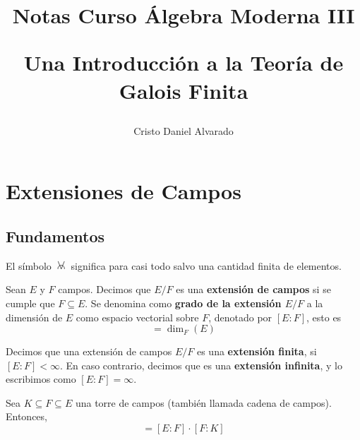 \documentclass[12pt]{report}
\theoremstyle{largebreak}
\newcommand{\afa}{\:
    \begin{tikzpicture}
        \draw [line width = 0.17 mm, black] (0,0) -- (-0.115,0.29);
        \draw [line width = 0.17 mm, black] (0,0) -- (0.115,0.29);
        \draw [line width = 0.17 mm, black] (-0.12,0) arc (190:-10:0.12cm);
    \end{tikzpicture}
    \:
}
\begin{document}
    \setlength{\parskip}{5pt} %
    \setlength{\parindent}{12pt} %
    \title{Notas Curso Álgebra Moderna III
    
    Una Introducción a la Teoría de Galois Finita}
    \author{Cristo Daniel Alvarado}
    \maketitle

    \tableofcontents %

    
    \chapter{Extensiones de Campos}
    
    \section{Fundamentos}

    \begin{obs}
        El símbolo $\afa$ significa para casi todo salvo una cantidad finita de elementos.
    \end{obs}

    \begin{mydef}
        Sean $E$ y $F$ campos. Decimos que $E/F$ es una \textbf{extensión de campos} si se cumple que $F\subseteq E$. Se denomina como \textbf{grado de la extensión $E/F$} a la dimensión de $E$ como espacio vectorial sobre $F$, denotado por $[E:F]$, esto es
        \begin{equation*}
            [E:F]=\dim_{ F}(E)
        \end{equation*}
    \end{mydef}
    
    \begin{mydef}
        Decimos que una extensión de campos $E/F$ es una \textbf{extensión finita}, si $[E:F]<\infty$. En caso contrario, decimos que es una \textbf{extensión infinita}, y lo escribimos como $[E:F]=\infty$.
    \end{mydef}

    \begin{theor}
        Sea $K\subseteq F\subseteq E$ una torre de campos (también llamada cadena de campos). Entonces,
        \begin{equation*}
            [E:K]=[E:F]\cdot[F:K]
        \end{equation*}
    \end{theor}
\end{document}
